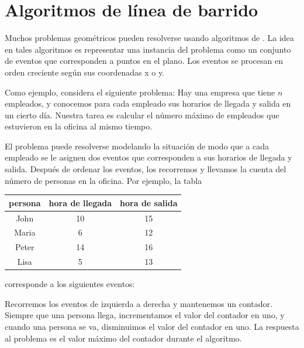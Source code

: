 \chapter{Algoritmos de línea de barrido}


Muchos problemas geométricos pueden resolverse usando
algoritmos de .
La idea en tales algoritmos es representar
una instancia del problema como un conjunto de eventos que corresponden
a puntos en el plano.
Los eventos se procesan en orden creciente
según sus coordenadas x o y.

Como ejemplo, considera el siguiente problema:
Hay una empresa que tiene $n$ empleados,
y conocemos para cada empleado sus horarios de llegada y
salida en un cierto día.
Nuestra tarea es calcular el número máximo de
empleados que estuvieron en la oficina al mismo tiempo.

El problema puede resolverse modelando la situación
de modo que a cada empleado se le asignen dos eventos que
corresponden a sus horarios de llegada y salida.
Después de ordenar los eventos, los recorremos
y llevamos la cuenta del número de personas en la oficina.
Por ejemplo, la tabla
\begin{center}
\begin{tabular}{ccc}
persona & hora de llegada & hora de salida \\
\hline
John & 10 & 15 \\
Maria & 6 & 12 \\
Peter & 14 & 16 \\
Lisa & 5 & 13 \\
\end{tabular}
\end{center}
corresponde a los siguientes eventos:
\begin{center}
\end{center}
Recorremos los eventos de izquierda a derecha
y mantenemos un contador.
Siempre que una persona llega, incrementamos
el valor del contador en uno,
y cuando una persona se va,
disminuimos el valor del contador en uno.
La respuesta al problema es el valor máximo
del contador durante el algoritmo.

